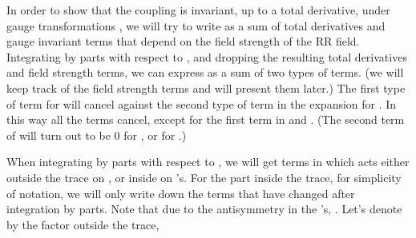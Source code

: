 \documentclass[a4paper,12pt]{article}
\begin{document}
In order to show that the coupling is invariant, up to a total derivative,  under gauge transformations \coordHE{}, we will try to write \coordHE{} as a sum of total derivatives  and gauge invariant  terms that depend on  the field strength of the RR field.  Integrating \coordHE{} by parts with respect to \coordHE{}, and  dropping the resulting total derivatives and field strength terms, we can express \coordHE{} as a sum of two types of terms. (we will keep track of the field strength terms  and will present them  later.)  The first type of term for \coordHE{} will cancel against the second type of term in the expansion for \coordHE{}. In this way all the terms cancel, except  for the first term in \coordHE{} and \coordHE{}. (The second term of \coordHE{} will turn out to be 0 for \coordHE{}, or for \coordHE{}.)  
   
When integrating \coordHE{} by parts with respect to \coordHE{}, we will get terms in which \coordHE{} acts either outside the trace on \coordHE{}, or inside on \myHighlight{$\phi$}\coordHE{}'s. For the part inside the trace, for simplicity of notation, we will only write down the \myHighlight{$\phi$}\coordHE{} terms that have changed  after integration by parts. 
Note that due to the antisymmetry in the \coordHE{}'s, \coordHE{}. 
Let's denote by \coordHE{} the factor outside the trace, 
\begin{center}
\myHighlight{$U^n_l =\frac{i^kp!}{k!n!l!(p-l)!}\left(\partial_{x^{i_1}}\ldots \partial_{x^{i_n}}\right) C^0_{i_1'\ldots i_{2k}'j_1\ldots j_l[a_{l+1}\ldots a_p}.$}\coordHE{} 
\end{center}
\end{document}
